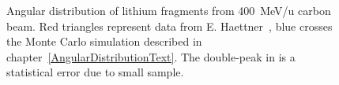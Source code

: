 \begin{figure}[!ht]
{\label{fig:D_31.2_3_N}
}
\label{fig:subfigureExample}
\caption[Optional caption for list of figures]{Angular distribution of lithium fragments from 400~MeV/u carbon beam. Red triangles represent data from E. Haettner~\cite{ehaettner}, blue crosses the Monte Carlo simulation described in chapter~\ref{AngularDistributionText}. The double-peak in  is a statistical error due to small sample.}
\end{figure}
\clearpage
